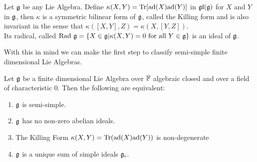 \begin{defi}
	Let $\mathfrak{g}$ be any Lie Algebra. Define $\kappa(X,Y)= \text{Tr} [\text{ad}(X)\text{ad}(Y)]$ in $\mathfrak{gl}(\mathfrak{g})$ for $X$ and $Y$ in $\mathfrak{g}$, then $\kappa$ is a symmetric bilinear form of $\mathfrak{g}$, called the Killing form and is also invariant in the sense that $\kappa([X,Y],Z)=\kappa(X,[Y,Z])$.\\
	Its radical, called $\text{Rad } \mathfrak{g} = \{X \in \mathfrak{g} | \kappa(X,Y)=0 \text{ for all } Y \in \mathfrak{g}\}$ is an ideal of $\mathfrak{g}$. 
	\label{Killing Form}
\end{defi}
With this in mind we can make the first step to classify semi-simple finite dimensional Lie Algebras.
\begin{teo}
	Let $\mathfrak{g}$ be a finite dimensional Lie Algebra over $\mathbb{F}$ algebraic closed and over a field of characteristic $0$. Then the following are equivalent:
	\begin{enumerate}
		\item $\mathfrak{g}$ is semi-simple.
		\item $\mathfrak{g}$ has no non-zero abelian ideals.
		\item The Killing Form $\kappa(X,Y)=\text{Tr}(\text{ad}(X)\text{ad}(Y))$ is non-degenerate
		\item $\mathfrak{g}$ is a unique sum of simple ideals $\mathfrak{g}_i$.
	\end{enumerate}
\end{teo}
